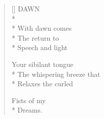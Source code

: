 \begin{verse}[\versewidth]
DAWN\\*
~\\*
With dawn comes\\*
The return to\\*
Speech and light

Your sibilant tongue\\*
The whispering breeze that\\*
Relaxes the curled

Fists of my\\*
Dreams.
\end{verse}
